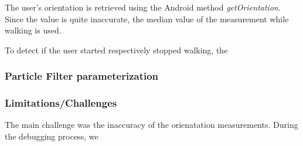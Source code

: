 \documentclass[12pt]{article}
\begin{document}
The user's orientation is retrieved using the Android method \textit{getOrientation}. Since the value is quite inaccurate, the median value of the measurement while walking is used.

To detect if the user started respectively stopped walking, the %

\subsubsection*{Particle Filter parameterization}


\subsubsection{Limitations/Challenges}
The main challenge was the inaccuracy of the orienatation measurements. During the debugging process, we 


\end{document}
